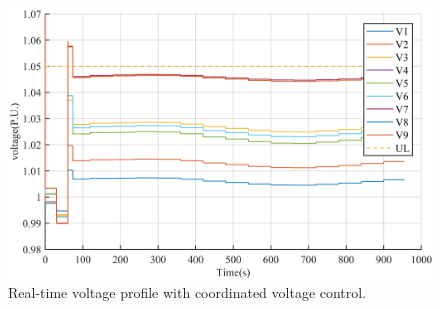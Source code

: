 \begin{figure}[!h]
\centering
\includegraphics[width=\linewidth]{figs/RT_VOLTAGES.png}
\caption{Real-time voltage profile with coordinated voltage control.}
\label{fig:RT_VVC}
\end{figure}

